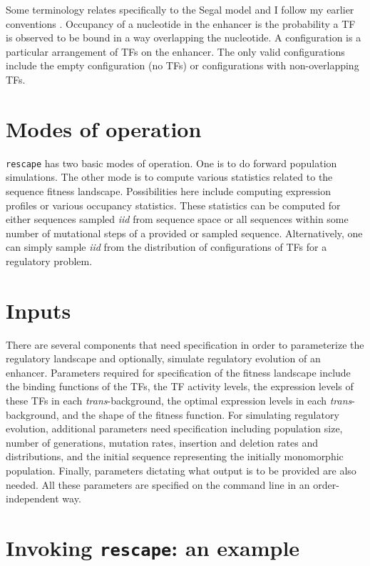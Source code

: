 \documentclass[11pt]{article}
\begin{document}
Some terminology relates specifically to the Segal model and I follow my earlier conventions \cite{Bullaughey:2011p6261}. Occupancy of a nucleotide in the enhancer is the probability a TF is observed to be bound in a way overlapping the nucleotide. A configuration is a particular arrangement of TFs on the enhancer. The only valid configurations include the empty configuration (no TFs) or configurations with non-overlapping TFs. 

\section{Modes of operation}

\texttt{rescape} has two basic modes of operation. One is to do forward population simulations. The other mode is to compute various statistics related to the sequence fitness landscape. Possibilities here include computing expression profiles or various occupancy statistics. These statistics can be computed for either sequences sampled \emph{iid} from sequence space or all sequences within some number of mutational steps of a provided or sampled sequence. Alternatively, one can simply sample \emph{iid} from the distribution of configurations of TFs for a regulatory problem.

\section{Inputs}

There are several components that need specification in order to parameterize the regulatory landscape and optionally, simulate regulatory evolution of an enhancer. Parameters required for specification of the fitness landscape include the binding functions of the TFs, the TF activity levels, the expression levels of these TFs in each \emph{trans}-background, the optimal expression levels in each \emph{trans}-background, and the shape of the fitness function. For simulating regulatory evolution, additional parameters need specification including population size, number of generations, mutation rates, insertion and deletion rates and distributions, and the initial sequence representing the initially monomorphic population. Finally, parameters dictating what output is to be provided are also needed. All these parameters are specified on the command line in an order-independent way. 

\section{Invoking \texttt{rescape}: an example}
\end{document}
